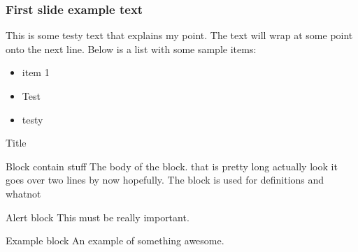 \documentclass[aspectratio=169]{beamer}
\begin{document}
\begin{frame}
  \frametitle{First slide example text}
  This is some testy text that explains my point. The text will wrap at some point onto the next line.
  Below is a list with some sample items:
  \begin{itemize}
    \item{item 1}
    \item{Test}
    \item{testy}
  \end{itemize}
\end{frame}

\begin{frame}{Title}
  \begin{block}{Block contain stuff}
    The body of the block. that is pretty long actually look it goes over two lines by now hopefully. The block is used for definitions and whatnot
  \end{block}
  \begin{alertblock}{Alert block}
    This must be really important.
  \end{alertblock}
  \begin{exampleblock}{Example block}
    An example of something awesome.
  \end{exampleblock}
\end{frame}

\maketitle
\end{document}
